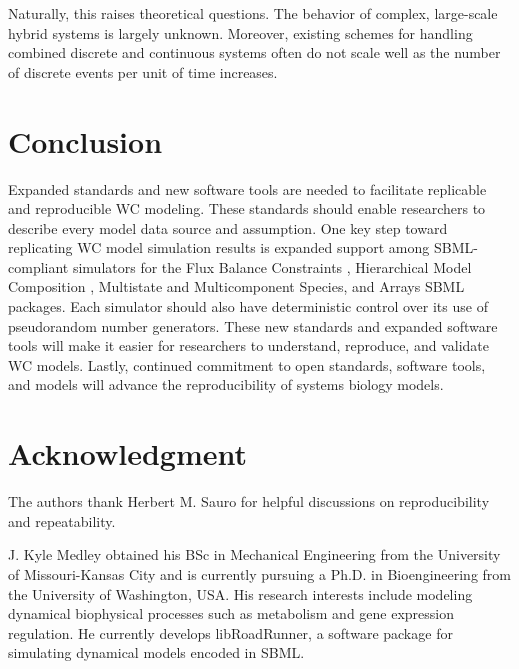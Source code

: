 \documentclass[journal,transmag,twoside]{IEEEtran}
\begin{document}
Naturally, this raises theoretical questions. The behavior of complex, large-scale hybrid systems is largely unknown. Moreover, existing schemes for handling combined discrete and continuous systems often do not scale well as the number of discrete events per unit of time increases.

\section{Conclusion}

Expanded standards and new software tools are needed to facilitate replicable and reproducible WC modeling.
These standards should enable researchers to describe every model data source and assumption. One key step toward replicating WC model simulation results is expanded support among SBML-compliant simulators for the 
Flux Balance Constraints \cite{olivier2015fbc}, Hierarchical Model Composition \cite{smith2015sbml}, Multistate and Multicomponent
Species, and Arrays \cite{watanabe2016efficient} SBML packages. 
Each simulator should also have deterministic control over its use of pseudorandom number generators.
These new standards and expanded software tools will make it easier for researchers to understand, reproduce, and validate WC models. 
Lastly, continued commitment to open standards, software tools, and models will advance the reproducibility of systems biology models.

\section{Acknowledgment}

The authors thank Herbert M. Sauro for helpful discussions
on reproducibility and repeatability.

\ifCLASSOPTIONcaptionsoff
  \newpage
\fi




\begin{IEEEbiography}{J. Kyle Medley}
obtained his BSc in Mechanical Engineering from the University of Missouri-Kansas City and
is currently pursuing a Ph.D. in Bioengineering from the University of Washington, USA.
His research interests include modeling dynamical biophysical processes such as
metabolism and gene expression regulation.
He currently develops libRoadRunner, a software package for simulating dynamical models encoded in SBML.
\end{IEEEbiography}
\end{document}
